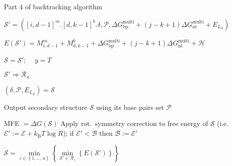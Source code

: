 \begin{algorithm}
	\caption*{Part 4 of backtracking algorithm}
	\begin{algorithmic}[1]
		\footnotesize
		
		
		
		\State $\mathcal{S}' = ([i,d-1]^m.[d,k-1]^b.\delta, \mathcal{P},  \Delta G_\text{bp}^\text{multi} + (j-k+1) \Delta G_\text{nt}^\text{multi} + E_{L_{\mathcal{S}}})$ 
		
		
		\State $E(\mathcal{S}') = M^m_{i,d-1} +  M^b_{d,k-1} + \Delta G_\text{bp}^\text{multi} + (j-k + 1)\Delta G_\text{nt}^\text{multi} + \mathcal{H} $
		
		
		
		\State $\mathcal{S} = \mathcal{S}'$; \ \  $y = T$
		
		\Else
		
		\State $\mathcal{S}' \Rightarrow \mathcal{R}_u$		
		\EndIf
		
		
		
		\EndIf
		\EndFor
		\EndIf
		\EndIf
		
		\State $(\delta, \mathcal{P}, E_{L_{\mathcal{S}}}) = \mathcal{S}$
		
		\If{$(\delta == \phi)$}
		
		\State Output secondary structure $\mathcal{S}$ using its base pairs set $\mathcal{P}$
		
		\State  MFE $= \Delta G(\mathcal{S})$   
		\Break  {}
		\Else
		\State Apply rot.~symmetry correction to free energy of $\mathcal{S}$ (i.e.~$\mathcal{E}' := \mathcal{E} + k_\mathrm{B} T \log R$);  
		if $\mathcal{E}'<\mathcal{B}$ then $\mathcal{B} := \mathcal{E}'$ 
		
		
		
		\State  $\mathcal{S} = \min\limits_{z \in \left\{1,\ldots,u\right\}}\left\{\min\limits_{\mathcal{S}' \in \mathcal{R}_z}\left\{ E(\mathcal{S}')\right\}\right\}$   
		

\end{algorithmic}
\end{algorithm}
